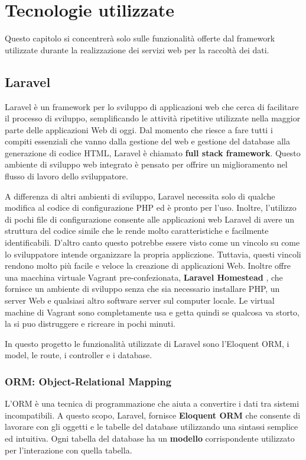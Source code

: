 \chapter{Tecnologie utilizzate}

Questo capitolo si concentrerà solo sulle funzionalità offerte dal framework utilizzate durante la realizzazione dei servizi web per la raccoltà dei dati.

\section{Laravel}
Laravel è un framework \citep{rif5} per lo sviluppo di applicazioni web che cerca di facilitare il processo di sviluppo, semplificando le attività ripetitive utilizzate nella maggior parte delle applicazioni Web di oggi.
Dal momento che riesce a fare tutti i compiti essenziali che vanno dalla gestione del web e gestione del database alla generazione di codice HTML, Laravel è chiamato \textbf{full stack framework}. Questo ambiente di sviluppo web integrato è pensato per offrire un miglioramento nel flusso di lavoro dello sviluppatore.

A differenza di altri ambienti di sviluppo, Laravel necessita solo di qualche modifica al codice di configurazione PHP ed è pronto per l'uso. Inoltre, l'utilizzo di pochi file di configurazione consente alle applicazioni web Laravel di avere un struttura del codice simile che le rende molto caratteristiche e facilmente identificabili. D'altro canto questo potrebbe essere visto come un vincolo su come lo sviluppatore intende organizzare la propria appliczione. Tuttavia, questi vincoli rendono molto più facile e veloce la creazione di applicazioni Web. Inoltre offre una macchina virtuale Vagrant pre-confezionata, \textbf{Laravel Homestead} \citep{rif13}, che fornisce un ambiente di sviluppo senza che sia necessario installare PHP, un server Web e qualsiasi altro software server sul computer locale. Le virtual machine di Vagrant sono completamente usa e getta quindi se qualcosa va storto, la si puo distruggere e ricreare in pochi minuti.

In questo progetto le funzionalità utilizzate di Laravel sono l'Eloquent ORM, i model, le route, i controller e i database.

\subsection{ORM: Object-Relational Mapping}
L'ORM è una tecnica di programmazione che aiuta a convertire i dati tra sistemi incompatibili.
A questo scopo, Laravel, fornisce \textbf{Eloquent ORM} che consente di lavorare con gli oggetti e le tabelle del database utilizzando una sintassi semplice ed intuitiva. Ogni tabella del database ha un \textbf{modello} corrispondente utilizzato per l'interazione con quella tabella. 

